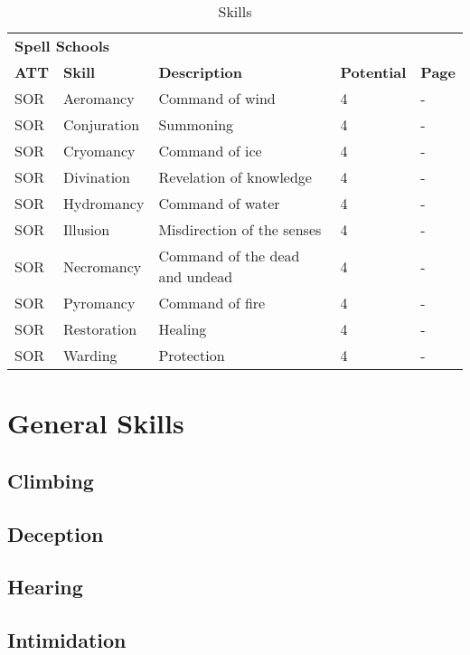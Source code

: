 \begin{multicols*}{2}
\begin{table*}[ht]
\begin{tabularx}{\textwidth}{l l X l l}
            \multicolumn{5}{l}{\bfseries{Spell Schools}} \\
            \bfseries{ATT} & \bfseries{Skill} & \bfseries{Description} & \bfseries{Potential} & \bfseries{Page} \\
            SOR & Aeromancy & Command of wind & 4 & - \\
            SOR & Conjuration & Summoning & 4 & - \\
            SOR & Cryomancy & Command of ice & 4 & - \\
            SOR & Divination & Revelation of knowledge & 4 & - \\
            SOR & Hydromancy & Command of water & 4 & - \\
            SOR & Illusion & Misdirection of the senses & 4 & - \\
            SOR & Necromancy & Command of the dead and undead & 4 & - \\
            SOR & Pyromancy & Command of fire & 4 & - \\
            SOR & Restoration & Healing & 4 & - \\
            SOR & Warding & Protection & 4 & - \\
        \end{tabularx}
        \caption{Skills}
        \label{tab:skills}
    \end{table*}

    \section{General Skills}

    \subsection{Climbing}\label{skill:climbing}

    \subsection{Deception}\label{skill:deception}

    \subsection{Hearing}\label{skill:hearing}

    \subsection{Intimidation}\label{skill:intimidation}


\end{multicols*}
